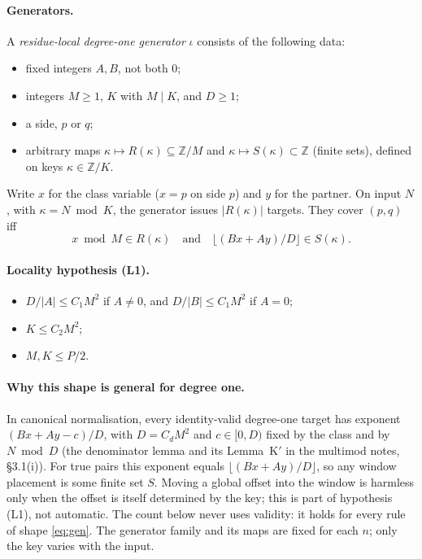 \documentclass[11pt]{amsart}
\theoremstyle{definition}
\newcommand{\Z}{\mathbb{Z}}
\begin{document}
\paragraph{Generators.} A \emph{residue-local degree-one generator} $\iota$ consists of the
following data:
\begin{itemize}
\item fixed integers $A,B$, not both $0$;
\item integers $M\ge1$, $K$ with $M\mid K$, and $D\ge1$;
\item a side, $p$ or $q$;
\item arbitrary maps $\kappa\mapsto R(\kappa)\subseteq\Z/M$ and $\kappa\mapsto S(\kappa)\subset\Z$
  (finite sets), defined on keys $\kappa\in\Z/K$.
\end{itemize}
Write $x$ for the class variable ($x=p$ on side $p$) and $y$ for the partner. On input $N$, with
$\kappa=N\bmod K$, the generator issues $|R(\kappa)|$ targets. They cover $(p,q)$ iff
\begin{equation}\label{eq:gen}
  x\bmod M\in R(\kappa)\quad\text{and}\quad\lfloor(Bx+Ay)/D\rfloor\in S(\kappa).
\end{equation}

\paragraph{Locality hypothesis (L1).}
\begin{itemize}
\item $D/|A|\le C_1M^2$ if $A\ne0$, and $D/|B|\le C_1M^2$ if $A=0$;
\item $K\le C_2M^2$;
\item $M,K\le P/2$.
\end{itemize}

\paragraph{Why this shape is general for degree one.}
In canonical normalisation, every identity-valid degree-one target has exponent $(Bx+Ay-c)/D$,
with $D=C_dM^2$ and $c\in[0,D)$ fixed by the class and by $N\bmod D$ (the denominator lemma and
its Lemma~K$'$ in the multimod notes, \S3.1(i)). For true pairs this exponent equals
$\lfloor(Bx+Ay)/D\rfloor$, so any window placement is some finite set $S$. Moving a global offset
into the window is harmless only when the offset is itself determined by the key; this is part of
hypothesis (L1), not automatic. The count below never uses validity: it holds for every rule of
shape \eqref{eq:gen}. The generator family and its maps are fixed for each $n$; only the key
varies with the input.
\end{document}
